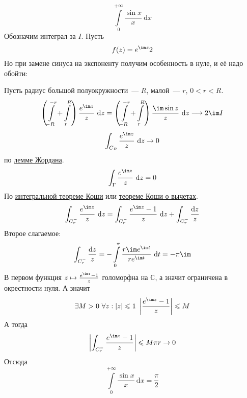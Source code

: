 \documentclass{article}
\begin{document}
    \begin{example}
        $$
        \int\limits_0^{+\infty}\frac{\sin x}x~\mathrm dx
        $$
        Обозначим интеграл за $I$. Пусть
        $$
        f(z)=e^{\im z}2
        $$
        Но при замене синуса на экспоненту получим особенность в нуле, и её надо обойти:
        \begin{figure}[H]
        \end{figure}\noindent
        Пусть радиус большой полуокружности~--- $R$, малой~--- $r$, $0<r<R$.
        $$
        \left(\int\limits_{-R}^{-r}+\int\limits_r^R\right)\frac{e^{\im z}}z~\mathrm dz=\left(\int\limits_{-R}^{-r}+\int\limits_r^R\right)\frac{\im\sin z}z~\mathrm dz\longrightarrow2\im I
        $$
        $$
        \int_{C_R}\frac{e^{\im z}}z~\mathrm dz\rightarrow 0
        $$
        по \hyperref[Лемма Жордана]{лемме Жордана}.
        $$
        \int_{\Gamma}\frac{e^{\im z}}z~\mathrm dz=0
        $$
        По \hyperref[Интегральная теорема Коши]{интегральной теореме Коши} или \hyperref[Теорема Коши о вычетах]{теореме Коши о вычетах}.
        $$
        \int_{C_r^-}\frac{e^{\im z}}z~\mathrm dz=\int_{C_r^-}\frac{e^{\im z}-1}z~\mathrm dz+\int_{C_r^-}\frac{\mathrm dz}z
        $$
        Второе слагаемое:
        $$
        \int_{C_r^-}\frac{\mathrm dz}z=-\int\limits_0^\pi\frac{r\im e^{\im t}}{re^{\im t}}~\mathrm dt=-\pi\im
        $$
        В первом функция $z\mapsto\frac{e^{\im z}-1}z$ голоморфна на $\mathbb C$, а значит ограничена в окрестности нуля. А значит
        $$
        \exists M>0~\forall z:|z|\leqslant 1~\left|\frac{e^{\im z}-1}z\right|\leqslant M
        $$
        А тогда
        $$
        \left|\int_{C_r^-}\frac{e^{\im z}-1}z\right|\leqslant M\pi r\rightarrow 0
        $$
        Отсюда
        $$
        \int\limits_0^{+\infty}\frac{\sin x}x~\mathrm dx=\frac\pi2
        $$
    \end{example}
\end{document}
